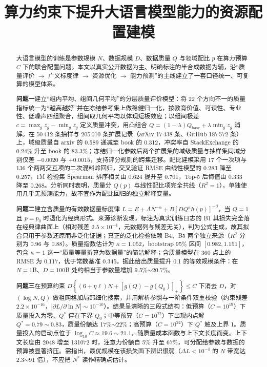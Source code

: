 \documentclass[bwprint]{gmcmthesis}
\title{算力约束下提升大语言模型能力的资源配置建模}
\begin{document}
\maketitle

\begin{abstract}

大语言模型的训练是参数规模 $N$、数据规模 $D$、数据质量 $Q$ 与领域配比 $p$ 在算力预算 $C$ 下的联合配置问题。本文以真实公开数据为主、明确标注的半合成数据为辅，沿``质量评价 $\to$ 广义标度律 $\to$ 资源优化 $\to$ 能力预测''的主线建立了一套口径统一、可复算的模型体系。

\textbf{问题一}建立``组内平均、组间几何平均''的分层质量评价模型：将 22 个方向不一的质量指标统一为``越高越好''并在冻结参考集上做稳健归一化，按教育价值、可读性、专业性、低噪声四组聚合，组间取几何平均以体现短板效应；以组间极差 $c=\max_g z_g-\min_g z_g$ 定义质量冲突，用凸组合 $Q=(1-\lambda)Q_{\mathrm{base}}+\lambda\min_g z_g$ 消解。在 50\,412 条抽样与 205\,010 条扩展记录（arXiv 17\,438 条、GitHub 187\,572 条）上，域级质量自 arxiv 的 0.589 递减至 book 的 0.312，冲突率自 StackExchange 的 0.24\% 升至 book 的 83.3\%；冻结归一化参数后两个扩展集的域级质量与抽样集同域分别仅差 $-0.0020$ 与 $+0.0015$，支持评分规则的跨集迁移。配比建模采用 17 个一次项与 136 个两两交互项的二次混料岭回归，交叉验证 RMSE 由线性模型的 0.283 降至 0.257，1M 检验集 Spearman 排序相关由 0.624 提升至 0.701，Top-5 后悔值由 0.333 降至 0.268。分析同时表明，质量分 $Q(p)$ 与线性配比项完全共线（$R^2=1$），单独使用几乎无预测能力，故不宜作为配比回归的独立解释变量。

\textbf{问题二}建立含质量的有效数据量标度律 $L=E+AN^{-\alpha}+B\left[DQ^{\kappa}h(p)\right]^{-\beta}$，当 $Q=1$ 且 $p=p_0$ 时退化为经典形式。来源诊断发现，标注为真实训练日志的 B1 其损失完全落在经典律曲面上（相对残差 $2.5\times10^{-4}$，元数据列与残差无关），判为公式生成，故其拟合只用于参数还原而非泛化证据；真正的泛化检验依赖 B4、B5 两个独立来源（$R^2$ 分别为 0.96 与 0.88）。质量指数估计为 $\kappa=1.052$，bootstrap 95\% 区间 $[0.982,1.151]$，包含 $\kappa=1$ 这一``质量等量折算为数据量''的简洁解释；含质量模型在 360 点上的 RMSE 为 0.117，优于常数基准 0.345。据此给出质量提升 0.1 的等效规模条件：在 $N=1$B、$D=100$B 处约相当于参数量增加 9.5\%$\sim$20.7\%。

\textbf{问题三}在预算约束 $D\left\{(6+\eta\ell)N+[g(Q)-g(Q_0)]_+\right\}\le C$ 下消去 $D$，对 $(\log N,Q)$ 做粗网格加局部细化搜索，并用解析参照与一阶条件双重校验（约束残差 $2.2\times10^{-16}$，$|\partial L/\partial\ln N|\sim10^{-10}$）。结果呈清晰的三段式结构：低预算（$C=10^{19}$）下质量投入为零、$Q^\ast$ 停在下界 $Q_0$；中等预算（$C=10^{22}$）下出现内点解 $Q^\ast=0.79\sim0.83$，质量份额达 17\%$\sim$22\%；高预算（$C=10^{24}$）下 $Q^\ast$ 触及上界 1。质量投入的启动点位于 $\log_{10}C\approx19.6\sim21.1$，随质量成本函数与上下文长度而变。上下文长度由 2048 增至 131072 时，注意力份额自 5\% 升至 67\%，可分配给参数与数据的预算被显著挤压。需指出，最优规模在该损失面下辨识很弱（$\Delta L<10^{-4}$ 的 $N$ 带宽达 2.3$\sim$91 倍），不应把 $N^\ast$ 读作精确点估计。


\end{abstract}
\end{document}
